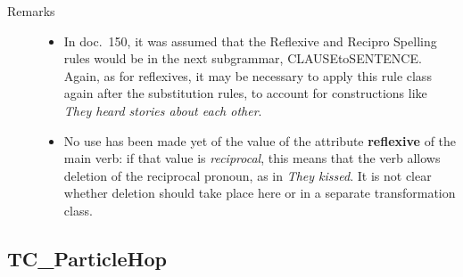 \begin{description}
\item[Remarks] \mbox{}
\begin{itemize}
\item In doc.\ 150, it was assumed that the Reflexive and Recipro 
Spelling rules would be in the next subgrammar, CLAUSEtoSENTENCE. Again, as for 
reflexives, it may be necessary to apply this rule class again after the 
substitution rules, to account for constructions like {\em They heard stories 
about each other\/}.
\item No use has been made yet of the value of the attribute {\bf reflexive} 
of the main verb: if that value is {\em reciprocal\/}, this means that the verb 
allows deletion of the reciprocal pronoun, as in {\em They kissed\/}. It is not 
clear whether deletion should take place here or in a separate transformation 
class.
\end{itemize}
\end{description}

\newpage
\subsection{TC\_ParticleHop}

